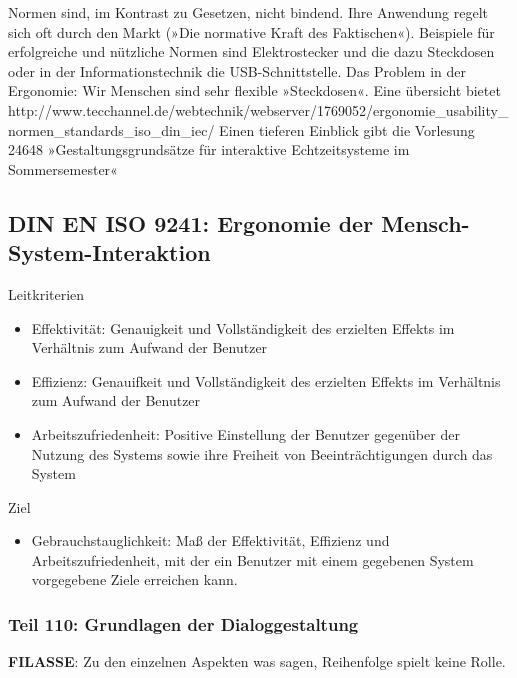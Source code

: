 \documentclass[paper=a4, fontsize=11pt]{scrartcl} %
\numberwithin{equation}{section} %
\numberwithin{figure}{section} %
\numberwithin{table}{section} %
\begin{document}
Normen sind, im Kontrast zu Gesetzen, nicht bindend. Ihre Anwendung regelt sich oft durch den Markt (»Die normative Kraft des Faktischen«). Beispiele für erfolgreiche und nützliche Normen sind Elektrostecker und die dazu Steckdosen oder in der Informationstechnik die USB-Schnittstelle.
Das Problem in der Ergonomie: Wir Menschen sind sehr flexible »Steckdosen«.
Eine übersicht bietet http://www.tecchannel.de/webtechnik/webserver/1769052/ergonomie\_usability\_normen\_standards\_iso\_din\_iec/
Einen tieferen Einblick gibt die Vorlesung 24648 »Gestaltungsgrundsätze für interaktive Echtzeitsysteme im Sommersemester«

\subsection{DIN EN ISO 9241: Ergonomie der Mensch-System-Interaktion}

Leitkriterien
\begin{itemize}
\item Effektivität: Genauigkeit und Vollständigkeit des erzielten Effekts im Verhältnis zum Aufwand der Benutzer
\item Effizienz: Genauifkeit und Vollständigkeit des erzielten Effekts im Verhältnis zum Aufwand der Benutzer
\item Arbeitszufriedenheit: Positive Einstellung der Benutzer gegenüber der Nutzung des Systems sowie ihre Freiheit von Beeinträchtigungen durch das System
\end{itemize}
Ziel
\begin{itemize}
\item Gebrauchstauglichkeit: Maß der Effektivität, Effizienz und Arbeitszufriedenheit, mit der ein Benutzer mit einem gegebenen System vorgegebene Ziele erreichen kann.
\end{itemize}

\subsubsection{Teil 110: Grundlagen der Dialoggestaltung}

\textbf{FILASSE}: Zu den einzelnen Aspekten was sagen, Reihenfolge spielt keine Rolle.
\end{document}
